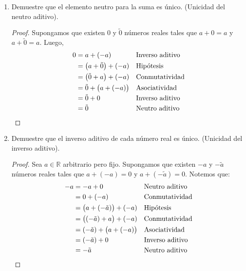 \documentclass[11pt]{article}
\newcommand{\R}{\mathbb{R}}
\begin{document}
\begin{enumerate}[label=\alph*)]
    \item Demuestre que el elemento neutro para la suma es único. (Unicidad del neutro aditivo).
    
\vspace{-1em}\begin{proof} 
    Supongamos que existen 0 y $\tilde{0}$ números reales tales que $a+0 = a$ y $a+\tilde{0} = a$. Luego, \begin{align*}
        0 &=a+(-a) && \text{Inverso aditivo}\\
        &=\left( a+\tilde{0} \right)+\left(-a\right) && \text{Hipótesis}\\
        &=\left( \tilde{0}+a \right)+\left(-a\right) && \text{Conmutatividad}\\
        &=\tilde{0} + \bigl( a + \left(-a \right)\bigr) && \text{Asociatividad}\\
        &=\tilde{0} + 0 && \text{Inverso aditivo}\\
        &=\tilde{0} && \text{Neutro aditivo}\qedhere
        \end{align*}    
\end{proof} \vspace{-1em}
    \item Demuestre que el inverso aditivo de cada número real es único. (Unicidad del inverso aditivo).
    
    \vspace{-1em}\begin{proof} 
        Sea $a\in \R$ arbitrario pero fijo. Supongamos que existen $-a$ y $-\tilde{a}$ números reales tales que $a + \left(-a\right) = 0$ y $a + \left(- \tilde{a}\right) = 0$. Notemos que:
    \begin{align*}
    -a &= -a+0 && \text{Neutro aditivo}\\
    &= 0+\left(-a\right) && \text{Conmutatividad}\\
    &= \bigl(a+\left(-\tilde{a} \right)\bigr)+\left(-a\right) && \text{Hipótesis}\\
    &= \bigl(\left(-\tilde{a} \right)+a\bigr)+\left(-a\right) && \text{Conmutatividad}\\
    &= \left(-\tilde{a} \right)+\bigl(a+\left(-a\right)\bigr) && \text{Asociatividad}\\
    &= \left(-\tilde{a} \right)+0 && \text{Inverso aditivo}\\
    &= -\tilde{a} && \text{Neutro aditivo} \qedhere
    \end{align*}    
    \end{proof} \vspace{-1em}


\end{enumerate}
\end{document}
